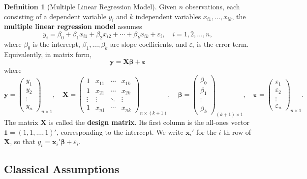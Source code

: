 \documentclass[12pt,a4paper]{article}
\theoremstyle{definition}
\newtheorem{definition}[theorem]{Definition}
\newcommand{\bX}{\mathbf{X}}
\newcommand{\by}{\mathbf{y}}
\newcommand{\bx}{\mathbf{x}}
\def\bb{\boldsymbol{\beta}}
\newcommand{\be}{\boldsymbol{\varepsilon}}
\newcommand{\bone}{\mathbf{1}}
\begin{document}
\begin{definition}[Multiple Linear Regression Model]\label{def:model}
Given $n$ observations, each consisting of a dependent variable $y_i$ and $k$ independent variables $x_{i1}, \ldots, x_{ik}$, the \textbf{multiple linear regression model} assumes
\begin{equation}
y_i = \beta_0 + \beta_1 x_{i1} + \beta_2 x_{i2} + \cdots + \beta_k x_{ik} + \varepsilon_i, \quad i = 1, 2, \ldots, n,
\end{equation}
where $\beta_0$ is the intercept, $\beta_1, \ldots, \beta_k$ are slope coefficients, and $\varepsilon_i$ is the error term. Equivalently, in matrix form,
\begin{equation}\label{eq:model-matrix}
\boxed{\by = \bX\bb + \be}
\end{equation}
where
\[
\by = \begin{pmatrix} y_1 \\ y_2 \\ \vdots \\ y_n \end{pmatrix}_{n \times 1}, \quad
\bX = \begin{pmatrix} 1 & x_{11} & \cdots & x_{1k} \\ 1 & x_{21} & \cdots & x_{2k} \\ \vdots & \vdots & \ddots & \vdots \\ 1 & x_{n1} & \cdots & x_{nk} \end{pmatrix}_{n \times (k+1)}, \quad
\bb = \begin{pmatrix} \beta_0 \\ \beta_1 \\ \vdots \\ \beta_k \end{pmatrix}_{(k+1) \times 1}, \quad
\be = \begin{pmatrix} \varepsilon_1 \\ \varepsilon_2 \\ \vdots \\ \varepsilon_n \end{pmatrix}_{n \times 1}.
\]
The matrix $\bX$ is called the \textbf{design matrix}. Its first column is the all-ones vector $\bone = (1, 1, \ldots, 1)'$, corresponding to the intercept. We write $\bx_i'$ for the $i$-th row of $\bX$, so that $y_i = \bx_i'\bb + \varepsilon_i$.
\end{definition}

\subsection{Classical Assumptions}
\end{document}
